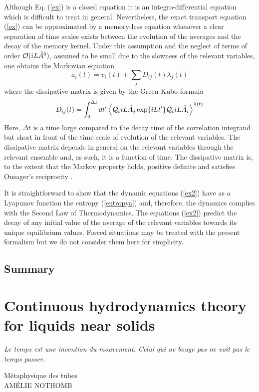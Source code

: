\documentclass[a4paper,openright,12pt]{book}
\begin{document}
Although Eq.  (\ref{ex})  is a closed
equation it is an integro-differential  equation which is difficult to
treat  in   general.   Nevertheless,  the  exact   transport  equation
(\ref{ex}) can  be approximated by  a memory-less equation  whenever a
clear separation  of time scales  exists between the evolution  of the
averages and  the decay of  the memory kernel. Under  this assumption
and the  neglect of terms of  order ${\cal O}( iL\hat{A}^3)$,  assumed to be
small due to  the slowness of the relevant variables,  one obtains the
Markovian equation \cite{Grabert1982}
\begin{equation}
\dot{a}_i(t) = v_i(t) + \sum_j D_{ij}(t) \lambda_j(t)
\label{ex2}
\end{equation}
where  the  dissipative matrix  is  given  by  the Green-Kubo  formula
\begin{equation}
D_{ij}(t)=\int_0^{\Delta t} dt'\left\langle 
{\cal Q}_t iL\hat{A}_j\exp\{iLt'\}{\cal Q}_t iL\hat{A}_i
\right\rangle^{\lambda(t)}
\label{dij}
\end{equation}
Here,  $\Delta t$ is  a  time large  compared  to the  decay  time of  the
correlation  integrand  but  short  in  front of  the  time  scale  of
evolution of  the relevant variables.  The  dissipative matrix depends
in general  on the  relevant variables  through the  relevant ensemble
and, as such, it is a function of time.  The dissipative matrix is, to
the  extent that  the  Markov property  holds,  positive definite  and
satisfies Onsager's reciprocity \cite{Grabert1982}.

It is straightforward  to show that the  dynamic equations (\ref{ex2})
have  as  a  Lyapunov   function  the  entropy  (\ref{entropya})  and,
therefore,   the   dynamics   complies   with  the   Second   Law   of
Thermodynamics.  The  equations (\ref{ex2})  predict the decay  of any
initial value  of the  average of the  relevant variables  towards its
unique equilibrium  values. Forced situations may  be treated
with the present  formalism \cite{Grabert1982} but we  do not consider
them here for simplicity.


\section{Summary}



\chapter{Continuous hydrodynamics theory for liquids near solids}\label{Chap:Theory}
\epigraph{\textit{Le temps est une invention du mouvement. Celui qui ne bouge pas ne voit pas le temps passer.}}{Métaphysique des tubes \\ AMÉLIE NOTHOMB}
\end{document}
